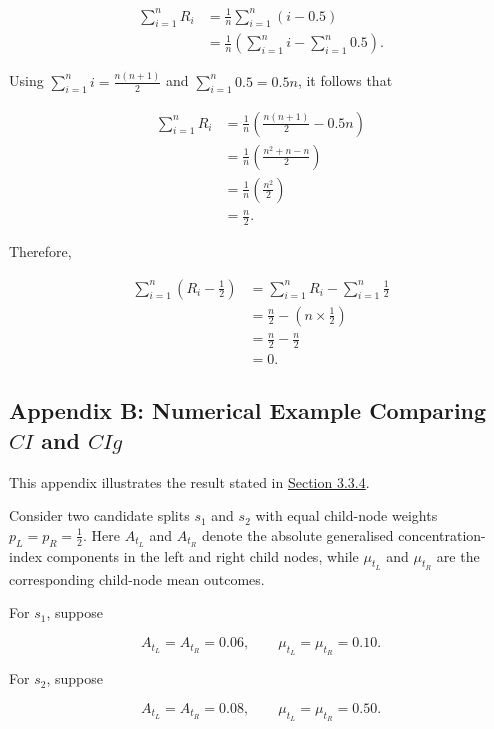 \documentclass[
  11pt,
  a4paper,
]{article}
\begin{document}
\[
\begin{aligned}
\sum_{i=1}^n R_i &= \frac{1}{n} \sum_{i=1}^n (i - 0.5) \\
&= \frac{1}{n} \left( \sum_{i=1}^n i - \sum_{i=1}^n 0.5 \right).
\end{aligned}
\]

Using \(\sum_{i=1}^n i = \frac{n(n+1)}{2}\) and
\(\sum_{i=1}^n 0.5 = 0.5n\), it follows that

\[
\begin{aligned}
\sum_{i=1}^n R_i &= \frac{1}{n} \left( \frac{n(n+1)}{2} - 0.5n \right) \\
&= \frac{1}{n} \left( \frac{n^2 + n - n}{2} \right) \\
&= \frac{1}{n} \left( \frac{n^2}{2} \right) \\
&= \frac{n}{2}.
\end{aligned}
\]

Therefore,

\[
\begin{aligned}
\sum_{i=1}^n \left( R_i - \frac{1}{2} \right) &= \sum_{i=1}^n R_i - \sum_{i=1}^n \frac{1}{2} \\
&= \frac{n}{2} - \left(n \times \frac{1}{2}\right) \\
&= \frac{n}{2} - \frac{n}{2} \\
&= 0.
\end{aligned}
\]

\subsection{\texorpdfstring{Appendix B: Numerical Example Comparing
\(CI\) and
\(CIg\)}{Appendix B: Numerical Example Comparing CI and CIg}}\label{app-ci-cig-example}

This appendix illustrates the result stated in
\hyperref[sec-split-behaviour-impurity]{Section 3.3.4}.

Consider two candidate splits \(s_1\) and \(s_2\) with equal child-node
weights \(p_L = p_R = \tfrac12\). Here \(A_{t_L}\) and \(A_{t_R}\)
denote the absolute generalised concentration-index components in the
left and right child nodes, while \(\mu_{t_L}\) and \(\mu_{t_R}\) are
the corresponding child-node mean outcomes.

For \(s_1\), suppose

\[
A_{t_L}=A_{t_R}=0.06,
\qquad
\mu_{t_L}=\mu_{t_R}=0.10.
\]

For \(s_2\), suppose

\[
A_{t_L}=A_{t_R}=0.08,
\qquad
\mu_{t_L}=\mu_{t_R}=0.50.
\]
\end{document}
